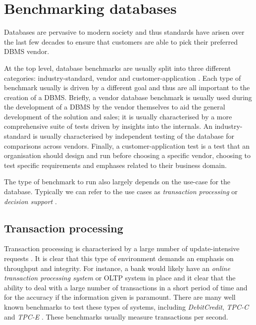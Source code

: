 \section{Benchmarking databases}
Databases are pervasive to modern society and thus standards have arisen over
the last few decades to ensure that customers are able to pick their preferred
DBMS vendor.

At the top level, database benchmarks are usually split into three different
categories: industry-standard, vendor and
customer-application \cite{PractitionersIntroduction}. Each type of benchmark
usually is driven by a different goal and thus are all important to the creation
of a DBMS. Briefly, a vendor database benchmark is usually used during the
development of a DBMS by the vendor themselves to aid
the general development of the solution and sales; it is usually characterised
by a more comprehensive suite of tests driven by insights into the internals. An
industry-standard is usually characterised by independent testing of the
database for comparisons across vendors. Finally, a customer-application test is
a test that an organisation should design and run before choosing a specific
vendor, choosing to test specific requirements and emphases related to their
business domain.


The type of benchmark to run also largely depends on the use-case for the
database. Typically we can refer to the use cases as \emph{transaction
processing} or \emph{decision support} \cite{PractitionersIntroduction}.

\subsection{Transaction processing}
Transaction processing is characterised by a large number of
update-intensive requests
\cite{PractitionersIntroduction}. It is clear that this type of environment
demands an emphasis on throughput and integrity. For instance, a bank would
likely have an \emph{online transaction processing system} or OLTP system in
place and it clear that the ability to deal with a large number of transactions
in a short period of time and for the accuracy if the information given is
paramount. There are many well known benchmarks to test these types of systems,
including \emph{DebitCredit}, \emph{TPC-C} and \emph{TPC-E} \cite{TPC-OLTP}.
These benchmarks usually measure transactions per second.
